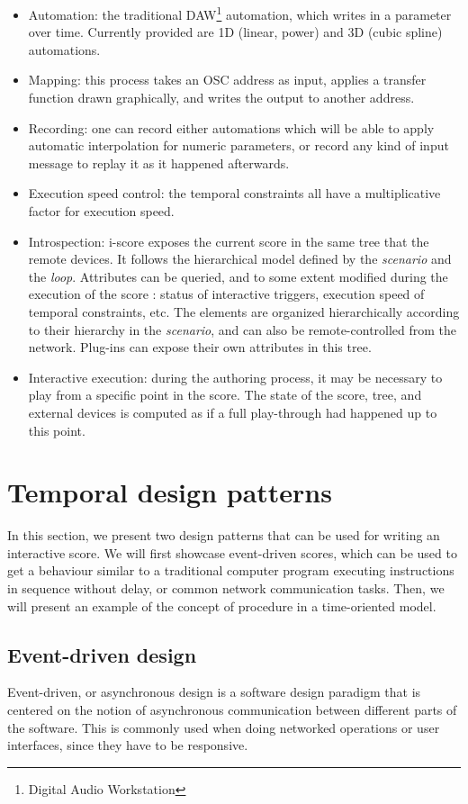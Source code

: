 \documentclass{article}
\newcommand{\scenario}{\textit{scenario}\xspace}
\newcommand{\Loop}{\textit{loop}\xspace}
\begin{document}
\begin{itemize}
\item Automation: the traditional DAW\footnote{Digital Audio Workstation} automation, which writes in a parameter over time. 
Currently provided are 1D (linear, power) and 3D (cubic spline) automations.
\item Mapping: this process takes an OSC address as input, applies a transfer function drawn graphically, and writes the output to another address.
\item Recording: one can record either automations which will be able to apply automatic interpolation for numeric parameters, or record any kind of input message to replay it as it happened afterwards.
\item Execution speed control: the temporal constraints all have a multiplicative factor for execution speed.
\item Introspection: i-score exposes the current score in the same tree that the remote devices. 
It follows the hierarchical model defined by the \scenario and the \Loop.
Attributes can be queried, and to some extent modified during the execution of the score : status of interactive triggers, execution speed of temporal constraints, etc.
The elements are organized hierarchically according to their hierarchy in the \scenario, and can also be remote-controlled from the network.
Plug-ins can expose their own attributes in this tree.
\item Interactive execution: during the authoring process, it may be necessary to play from a specific point in the score. The state of the score, tree, and external devices is computed as if a full play-through had happened up to this point.
\end{itemize}

\section{Temporal design patterns}
In this section, we present two design patterns that can be used 
for writing an interactive score.
We will first showcase event-driven scores, which can be used to get a behaviour 
similar to a traditional computer program executing instructions in sequence without delay, or common network communication tasks.
Then, we will present an example of the concept of procedure in a time-oriented model.
\subsection{Event-driven design}
Event-driven, or asynchronous design is a software design 
paradigm that is centered on the notion of asynchronous 
communication between different parts of the software.
This is commonly used when doing networked operations or 
user interfaces, since they have to be responsive.
\end{document}
